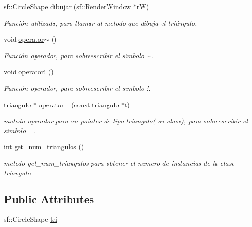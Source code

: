 \begin{DoxyCompactItemize}
sf\+::\+Circle\+Shape \hyperlink{classtriangulo_a2fd521e84e1c22e67e7141ff66a81cd6}{dibujar} (sf\+::\+Render\+Window $\ast$rW)
\begin{DoxyCompactList}\small\item\em Función utilizada, para llamar al metodo que dibuja el triángulo. \end{DoxyCompactList}\item 
\mbox{\label{classtriangulo_a62e3245477ae9ebd6023ac2cee4583b6}} 
void \hyperlink{classtriangulo_a62e3245477ae9ebd6023ac2cee4583b6}{operator$\sim$} ()
\begin{DoxyCompactList}\small\item\em Función operador, para sobreescribir el simbolo $\sim$. \end{DoxyCompactList}\item 
\mbox{\label{classtriangulo_a9b0da9528de42b5f9bc12a96fbb93ddf}} 
void \hyperlink{classtriangulo_a9b0da9528de42b5f9bc12a96fbb93ddf}{operator!} ()
\begin{DoxyCompactList}\small\item\em Función operador, para sobreescribir el simbolo !. \end{DoxyCompactList}\item 
\hyperlink{classtriangulo}{triangulo} $\ast$ \hyperlink{classtriangulo_a0ed50f358a39886c852e30adb0bcaa7d}{operator=} (const \hyperlink{classtriangulo}{triangulo} $\ast$t)
\begin{DoxyCompactList}\small\item\em metodo operador para un pointer de tipo \hyperlink{classtriangulo}{triangulo( su clase)}, para sobreescribir el simbolo =. \end{DoxyCompactList}\item 
\mbox{\label{classtriangulo_a0ac0e139c7cfe3cd3cd4f21d1284b446}} 
int \hyperlink{classtriangulo_a0ac0e139c7cfe3cd3cd4f21d1284b446}{get\+\_\+num\+\_\+triangulos} ()
\begin{DoxyCompactList}\small\item\em metodo get\+\_\+num\+\_\+triangulos para obtener el numero de instancias de la clase triangulo. \end{DoxyCompactList}\end{DoxyCompactItemize}
\subsection*{Public Attributes}
\begin{DoxyCompactItemize}
\item 
sf\+::\+Circle\+Shape \hyperlink{classtriangulo_ad79b94dd36cc834a648db2f6b00a9c69}{tri}
\end{DoxyCompactItemize}
